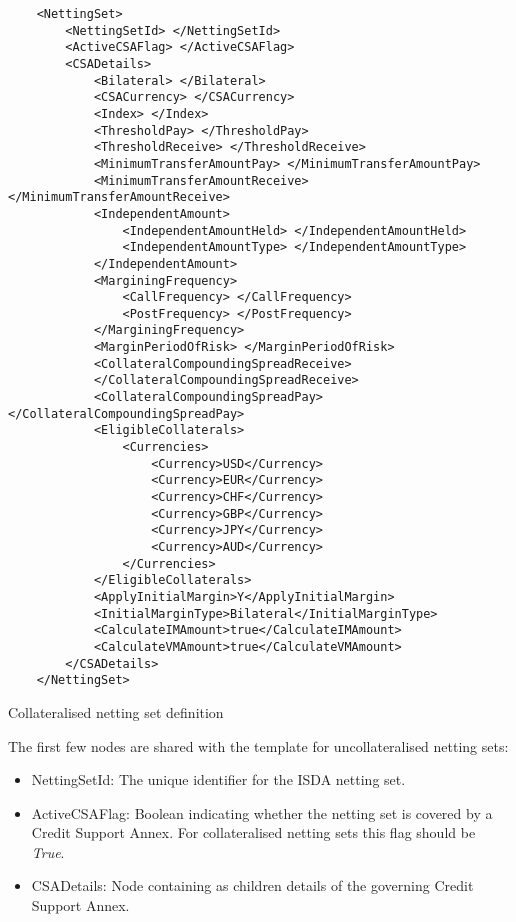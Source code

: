 \begin{listing}[H]
\begin{verbatim}
    <NettingSet>
        <NettingSetId> </NettingSetId>
        <ActiveCSAFlag> </ActiveCSAFlag>
        <CSADetails>
            <Bilateral> </Bilateral>
            <CSACurrency> </CSACurrency>
            <Index> </Index>
            <ThresholdPay> </ThresholdPay>
            <ThresholdReceive> </ThresholdReceive>
            <MinimumTransferAmountPay> </MinimumTransferAmountPay>
            <MinimumTransferAmountReceive> </MinimumTransferAmountReceive>
            <IndependentAmount>
                <IndependentAmountHeld> </IndependentAmountHeld>
                <IndependentAmountType> </IndependentAmountType>
            </IndependentAmount>
            <MarginingFrequency>
                <CallFrequency> </CallFrequency>
                <PostFrequency> </PostFrequency>
            </MarginingFrequency>
            <MarginPeriodOfRisk> </MarginPeriodOfRisk>
            <CollateralCompoundingSpreadReceive> 
            </CollateralCompoundingSpreadReceive>
            <CollateralCompoundingSpreadPay> </CollateralCompoundingSpreadPay>
            <EligibleCollaterals>
                <Currencies>
                    <Currency>USD</Currency>
                    <Currency>EUR</Currency>
                    <Currency>CHF</Currency>
                    <Currency>GBP</Currency>
                    <Currency>JPY</Currency>
                    <Currency>AUD</Currency>
                </Currencies>
            </EligibleCollaterals>
            <ApplyInitialMargin>Y</ApplyInitialMargin>
            <InitialMarginType>Bilateral</InitialMarginType>
            <CalculateIMAmount>true</CalculateIMAmount>
            <CalculateVMAmount>true</CalculateVMAmount>
        </CSADetails>
    </NettingSet>
\end{verbatim}
\caption{Collateralised netting set definition}
\label{lst:nettingSetCollat}
\end{listing}

The first few nodes are shared with the template for uncollateralised
netting sets:
\begin{itemize}
\item NettingSetId: The unique identifier for the ISDA netting set.
\item ActiveCSAFlag: Boolean indicating whether the netting set is
  covered by a Credit Support Annex. For collateralised netting sets
  this flag should be \emph{True}.
\item CSADetails: Node containing as children details of the governing
  Credit Support Annex. 
\end{itemize}

